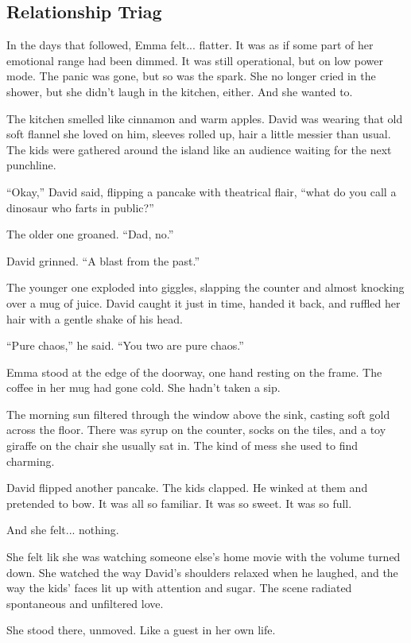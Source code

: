
\subsection{Relationship Triag}

In the days that followed, Emma felt... flatter. It was as if some part of her emotional 
range had been dimmed. It was still operational, but on low power mode. The panic was gone, but so was the 
spark. She no longer cried in the shower, but she didn’t laugh in the kitchen, either. And she 
wanted to.

The kitchen smelled like cinnamon and warm apples. David was wearing that old soft flannel she loved on 
him, sleeves rolled up, hair a little messier than usual. The kids were gathered around the island like 
an audience waiting for the next punchline.

``Okay,'' David said, flipping a pancake with theatrical flair, ``what do you call a dinosaur who farts 
in public?''

The older one groaned. ``Dad, no.''

David grinned. ``A blast from the past.''

The younger one exploded into giggles, slapping the counter and almost knocking over a mug of juice.
David caught it just in time, handed it back, and ruffled her hair with a gentle shake of his head.

``Pure chaos,'' he said. ``You two are pure chaos.''

Emma stood at the edge of the doorway, one hand resting on the frame. The coffee in her mug had gone cold. 
She hadn’t taken a sip.

The morning sun filtered through the window above the sink, casting soft gold across the floor. There was 
syrup on the counter, socks on the tiles, and a toy giraffe on the chair she usually sat in. The kind of mess 
she used to find charming. 

David flipped another pancake. The kids clapped. He winked at them and pretended to bow. It was all so familiar. 
It was so sweet. It was so full.

And she felt... nothing.

She felt lik she was watching someone else’s home movie with the volume turned down. She watched the way David’s 
shoulders relaxed when he laughed, and the way the kids’ faces lit up with attention and sugar. The scene 
radiated spontaneous and unfiltered love.

She stood there, unmoved. Like a guest in her own life.

